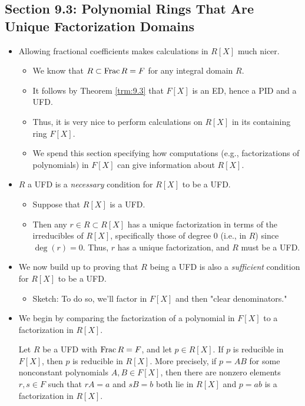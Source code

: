 \documentclass[../notes.tex]{subfiles}
\begin{document}
\subsection*{Section 9.3: Polynomial Rings That Are Unique Factorization Domains}
\begin{itemize}
    \item Allowing fractional coefficients makes calculations in $R[X]$ much nicer.
    \begin{itemize}
        \item We know that $R\subset\operatorname{Frac} R=F$ for any integral domain $R$.
        \item It follows by Theorem \ref{trm:9.3} that $F[X]$ is an ED, hence a PID and a UFD.
        \item Thus, it is very nice to perform calculations on $R[X]$ in its containing ring $F[X]$.
        \item We spend this section specifying how computations (e.g., factorizations of polynomials) in $F[X]$ can give information about $R[X]$.
    \end{itemize}
    \item $R$ a UFD is a \emph{necessary} condition for $R[X]$ to be a UFD.
    \begin{itemize}
        \item Suppose that $R[X]$ is a UFD.
        \item Then any $r\in R\subset R[X]$ has a unique factorization in terms of the irreducibles of $R[X]$, specifically those of degree 0 (i.e., in $R$) since $\deg(r)=0$. Thus, $r$ has a unique factorization, and $R$ must be a UFD.
    \end{itemize}
    \item We now build up to proving that $R$ being a UFD is also a \emph{sufficient} condition for $R[X]$ to be a UFD.
    \begin{itemize}
        \item Sketch: To do so, we'll factor in $F[X]$ and then "clear denominators."
    \end{itemize}
    \item We begin by comparing the factorization of a polynomial in $F[X]$ to a factorization in $R[X]$.
    \begin{proposition}\label{prp:9.5}
        Let $R$ be a UFD with $\operatorname{Frac} R=F$, and let $p\in R[X]$. If $p$ is reducible in $F[X]$, then $p$ is reducible in $R[X]$. More precisely, if $p=AB$ for some nonconstant polynomials $A,B\in F[X]$, then there are nonzero elements $r,s\in F$ such that $rA=a$ and $sB=b$ both lie in $R[X]$ and $p=ab$ is a factorization in $R[X]$.

\end{proposition}
\end{itemize}
\end{document}
